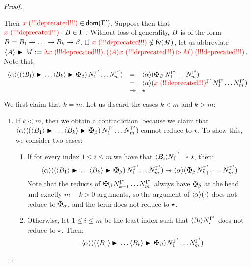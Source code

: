 \begin{proof}
\begin{enumerate}
  Then $\textcolor{red}{x \text{\,\,(!!!deprecated!!!)}} \in \mathsf{dom}(\Gamma')$. Suppose then that $\textcolor{red}{x \text{\,\,(!!!deprecated!!!)}}:B\in\Gamma'$.
  Without loss of generality, $B$ is of the form
  $B = B_1\to\hdots\to B_k\to\beta$.
  If $\textcolor{red}{x \text{\,\,(!!!deprecated!!!)}} \notin \mathsf{fv}(M)$,
  let us abbreviate $\langle A\rangle\blacktriangleright\,M := \textcolor{red}{\lambda \textcolor{red}{x \text{\,\,(!!!deprecated!!!)}}.\,(\langle A\rangle\textcolor{red}{x \text{\,\,(!!!deprecated!!!)}}\rhd M) \text{\,\,(!!!deprecated!!!)}}$.
  Note that:
  \[
    \begin{array}{rlll}
      \verifbtyp{((\lamt{\typtwo_1}{\hdots\lamt{\typtwo_k}{\gen{\btyptwo}}})\,\subs{\utmtwo_1}{\tenvtwo}\hdots\subs{\utmtwo_m}{\tenvtwo})}
    & = &
      \verifbtyp{(\gen{\typtwo}\,\subs{\utmtwo_1}{\tenvtwo}\hdots\subs{\utmtwo_m}{\tenvtwo})}
    \\
    & = &
      \verifbtyp{(\subs{\var}{\tenvtwo}\,\subs{\utmtwo_1}{\tenvtwo}\hdots\subs{\utmtwo_m}{\tenvtwo})}
    \\
    & \tos &
      \iunit
    \end{array}
  \]
  We first claim that $k = m$.
  Let us discard the cases $k < m$ and $k > m$:
  \begin{enumerate}
  \item
    If $k < m$, then we obtain a contradiction, because we claim that
    $\verifbtyp{((\lamt{\typtwo_1}{\hdots\lamt{\typtwo_k}{\gen{\btyptwo}}})\,\subs{\utmtwo_1}{\tenvtwo}\hdots\subs{\utmtwo_m}{\tenvtwo})}$
    cannot reduce to $\star$.
    To show this, we consider two cases:
    \begin{enumerate}
    \item
      \label{thm:completeness:case_k_lt_m_stuck}
      If for every index $1 \leq i \leq m$ we have that
      $\langle B_i\rangle N_i^{\Gamma'} \twoheadrightarrow \star$,
      then:
      \[
        \verifbtyp{((\lamt{\typtwo_1}{\hdots\lamt{\typtwo_k}{\gen{\btyptwo}}})\,\subs{\utmtwo_1}{\tenvtwo}\hdots\subs{\utmtwo_m}{\tenvtwo})}
        \tos
        \verifbtyp{(\gen{\btyptwo}\,\subs{\utmtwo_{k+1}}{\tenvtwo}\hdots\subs{\utmtwo_m}{\tenvtwo})}
      \]
      Note that the reducts of $\gen{\btyptwo}\,\subs{\utmtwo_{k+1}}{\tenvtwo}\hdots\subs{\utmtwo_m}{\tenvtwo}$
      always have $\gen{\btyptwo}$ at the head and exactly $m - k > 0$ arguments,
      so the argument of $\langle\alpha\rangle(\cdot)$ does not reduce to $\genbtyp$,
      and the term does not reduce to $\star$.
    \item
      Otherwise, let $1 \leq i \leq m$ be the least index such that
      $\langle B_i\rangle N_i^{\Gamma'}$ does not reduce to $\star$.
      Then:
      \[
        \begin{array}{ll}
        &
        \verifbtyp{((\lamt{\typtwo_1}{\hdots\lamt{\typtwo_k}{\gen{\btyptwo}}})\,\subs{\utmtwo_1}{\tenvtwo}\hdots\subs{\utmtwo_m}{\tenvtwo})}

\end{array}\]
\end{enumerate}
\end{enumerate}
\end{enumerate}
\end{proof}
